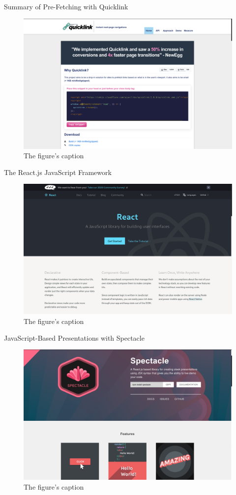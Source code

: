 \documentclass[14pt,aspectratio=169]{beamer}
\begin{document}
%
\begin{frame}{Summary of Pre-Fetching with Quicklink}
  \begin{figure}
    \centering
    \includegraphics[scale=.08]{images/quicklink.png}
    \caption{The figure's caption}
  \end{figure}
\end{frame}

%
\begin{frame}{The React.js JavaScript Framework}
  \begin{figure}
    \centering
    \includegraphics[scale=.08]{images/reactjs.png}
    \caption{The figure's caption}
  \end{figure}
\end{frame}

%
\begin{frame}{JavaScript-Based Presentations with Spectacle}
  \begin{figure}
    \centering
    \includegraphics[scale=.08]{images/spectacle-javascript.png}
    \caption{The figure's caption}
  \end{figure}
\end{frame}
\end{document}
